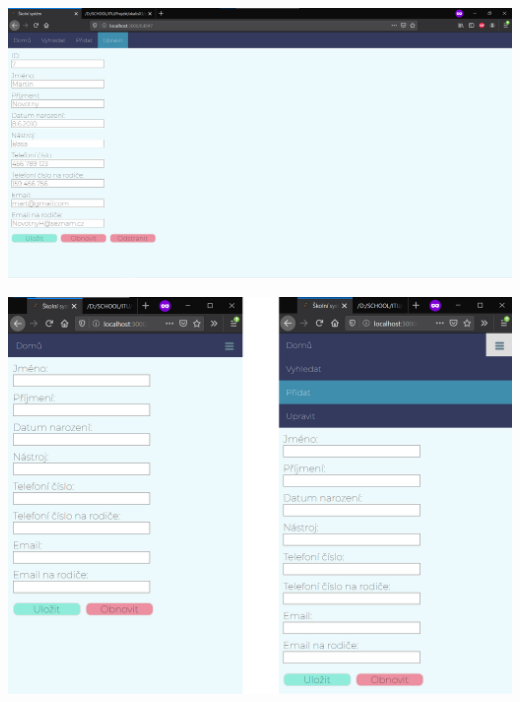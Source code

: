 \documentclass[a4paper, 11pt, twocolumn]{article}
\begin{document}
	\begin{center}
	\includegraphics[width=1\textwidth]{administ_edit.png}
	\end{center}
	\vspace*{\fill}
	\begin{center}
	\includegraphics[width=1\textwidth]{administ_minimized.png}
	\end{center}
\end{document}
